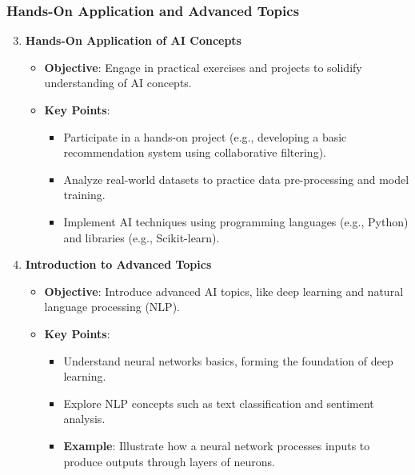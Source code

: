 \documentclass[aspectratio=169]{beamer}
\begin{document}
\begin{frame}[fragile]
    \frametitle{Hands-On Application and Advanced Topics}
    \begin{enumerate}
        \setcounter{enumi}{2}
        \item \textbf{Hands-On Application of AI Concepts}
        \begin{itemize}
            \item \textbf{Objective}: Engage in practical exercises and projects to solidify understanding of AI concepts.
            \item \textbf{Key Points}:
            \begin{itemize}
                \item Participate in a hands-on project (e.g., developing a basic recommendation system using collaborative filtering).
                \item Analyze real-world datasets to practice data pre-processing and model training.
                \item Implement AI techniques using programming languages (e.g., Python) and libraries (e.g., Scikit-learn).
            \end{itemize}
        \end{itemize}

        \item \textbf{Introduction to Advanced Topics}
        \begin{itemize}
            \item \textbf{Objective}: Introduce advanced AI topics, like deep learning and natural language processing (NLP).
            \item \textbf{Key Points}:
            \begin{itemize}
                \item Understand neural networks basics, forming the foundation of deep learning.
                \item Explore NLP concepts such as text classification and sentiment analysis.
                \item \textbf{Example}: Illustrate how a neural network processes inputs to produce outputs through layers of neurons.
            \end{itemize}
        \end{itemize}
    \end{enumerate}
\end{frame}
\end{document}
